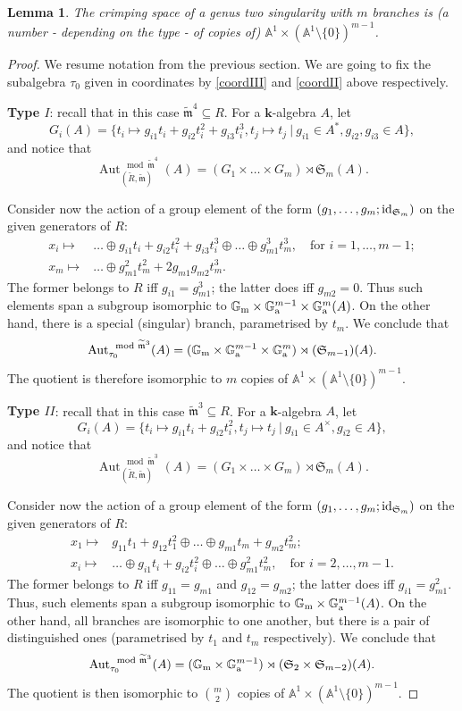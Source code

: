 \documentclass[11pt]{amsart}
\renewcommand{\k}{\mathbf k}
\newcommand{\tR}{\widetilde{R}}
\newcommand{\tm}{\widetilde{\mathfrak m}}
\newcommand{\Aaff}{\mathbb A}
\newcommand{\Gm}{\mathbb{G}_{\rm{m}}}
\newcommand{\Ga}{\mathbb{G}_{\rm{a}}}
\newcommand{\Aut}{\operatorname{Aut}}
\newcommand{\id}{{\rm id}}
\theoremstyle{plain}
\newtheorem{lem}[thm]{Lemma}
\theoremstyle{definition}
\begin{document}
\begin{lem}\label{lem:crimping}
 The crimping space of a genus two singularity with $m$ branches is (a number - depending on the type - of copies of) $\Aaff^1\times(\Aaff^1\setminus\{0\})^{m-1}$.
\end{lem}
\begin{proof}
We resume notation from the previous section. We are going to fix the subalgebra $\tau_0$ given in coordinates by \eqref{coordIII} and \eqref{coordII} above respectively.

\textbf{Type $I$}: recall that in this case $\tm^4\subseteq R$. For a $\k$-algebra $A$, let
\[G_i(A)=\{t_i\mapsto g_{i1}t_i+g_{i2}t_i^2+g_{i3}t_i^3,t_j\mapsto t_j\ |\ g_{i1}\in A^*,g_{i2},g_{i3}\in A\},\]
and notice that
\[\Aut_{(\tR,\tm)}^{\mod\tm^4}(A)=(G_1\times\ldots\times G_m)\rtimes \mathfrak{S}_m(A).\]

Consider now the action of a group element of the form $(g_1,\ldots,g_m;\id_{\mathfrak{S}_m})$ on the given generators of $R$:
\begin{align*}
 x_i\mapsto& \ldots\oplus g_{i1}t_i+g_{i2}t_i^2+g_{i3}t_i^3\oplus\ldots\oplus g_{m1}^3t_m^3,\quad\text{for } i=1,\ldots,m-1;\\
 x_m\mapsto& \ldots\oplus g_{m1}^2t_m^2+2g_{m1}g_{m2}t_m^3.
\end{align*}
The former belongs to $R$ iff $g_{i1}=g_{m1}^3$; the latter does iff $g_{m2}=0$. Thus such elements span a subgroup isomorphic to $\Gm\times\Ga^{m-1}\times\Ga^m(A)$. On the other hand, there is a special (singular) branch, parametrised by $t_m$. We conclude that
\[\Aut_{\tau_0}^{\mod\tm^3}(A)=(\Gm\times\Ga^{m-1}\times\Ga^m)\rtimes(\mathfrak{S}_{m-1})(A).\]
The quotient is therefore isomorphic to $m$ copies of $\Aaff^1\times(\Aaff^1\setminus\{0\})^{m-1}$. 

\textbf{Type $I\!I$}: recall that in this case $\tm^3\subseteq R$. For a $\k$-algebra $A$, let
\[G_i(A)=\{t_i\mapsto g_{i1}t_i+g_{i2}t_i^2,t_j\mapsto t_j\ |\ g_{i1}\in A^\times,g_{i2}\in A\},\]
and notice that
\[\Aut_{(\tR,\tm)}^{\mod\tm^3}(A)=(G_1\times\ldots\times G_m)\rtimes \mathfrak{S}_m(A).\]

Consider now the action of a group element of the form $(g_1,\ldots,g_m;\id_{\mathfrak{S}_m})$ on the given generators of $R$:
\begin{align*}
 x_1\mapsto& g_{11}t_1+g_{12}t_1^2\oplus\ldots\oplus g_{m1}t_m+g_{m2}t_m^2;\\
 x_i\mapsto& \ldots\oplus g_{i1}t_i+g_{i2}t_i^2\oplus\ldots\oplus g_{m1}^2t_m^2,\quad\text{for } i=2,\ldots,m-1.
\end{align*}
The former belongs to $R$ iff $g_{11}=g_{m1}$ and $g_{12}=g_{m2}$; the latter does iff $g_{i1}=g_{m1}^2$. Thus, such elements span a subgroup isomorphic to $\Gm\times\Ga^{m-1}(A)$. On the other hand, all branches are isomorphic to one another, but there is a pair of distinguished ones (parametrised by $t_1$ and $t_m$ respectively). We conclude that
\[\Aut_{\tau_0}^{\mod\tm^3}(A)=(\Gm\times\Ga^{m-1})\rtimes(\mathfrak{S}_2\times\mathfrak{S}_{m-2})(A).\]
The quotient is then isomorphic to $\binom{m}{2}$ copies of $\Aaff^1\times(\Aaff^1\setminus\{0\})^{m-1}$.
\end{proof}
\end{document}
